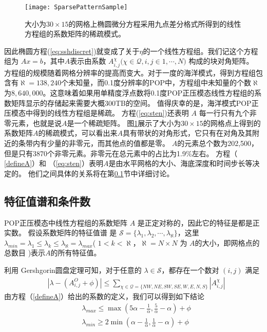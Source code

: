 \begin{figure}
\centering
\texttt{[image: SparsePatternSample]}
\caption[] {大小为$30\times 15$的网格上椭圆微分方程采用九点差分格式所得到的线性方程组的系数矩阵的稀疏模式。 \label{fig:spy}}
\end{figure}
因此椭圆方程(\ref{eq:sshdiscret})就变成了关于$\eta$的一个线性方程组。我们记这个方程组为 $Ax= b$，其中$A$表示由系数 $A_{i,j}^{\chi } ( \chi \in \mathcal{Q}, i,j \in {1,\cdots, N)}$ 构成的块对角矩阵。
方程组的规模随着网格分辨率的提高而变大。对于一度的海洋模式，得到方程组包含有$\aleph = 138,240$个未知量，而0.1度分辨率的POP中，方程组中未知量的个数$\aleph$ 为$8,640,000$。这意味着如果用单精度浮点数将0.1度POP正压模态线性方程组的系数矩阵显示的存储起来需要大概300TB的空间。
值得庆幸的是，海洋模式POP正压模态中得到的线性方程组是稀疏。
方程(\ref{eq:sten})还表明 $A$ 每一行只有九个非零元素，也就是说$A$是一个稀疏矩阵。 图\ref{fig:spy}展示了大小为$30\times 15$的网格点上得到的系数矩阵$A$的稀疏模式，可以看出来$A$具有带状的对角形式，它只有在对角及其附近的条带内有少量的非零元，而其他点的值都是零。
$A$的元素总个数为202,500，但是只有3870个非零元素。非零元在总元素中的占比为1.9\%左右。
方程（ \ref{defineA}）和 （\ref{eq:sten}）表明$A$是由水平网格的大小、海底深度和时间步长等决定的。
他们之间具体的关系将在第\ref{solver:Algorithm:condition}节中详细讨论。

\subsection{特征值谱和条件数}
\label{solver:Algorithm:condition}

POP正压模态中线性方程组的系数矩阵 $A$ 是正定对称的\cite{smith2010parallel}，因此它的特征是都是正实数\cite{stewart1976positive}。
假设系数矩阵的特征值谱\cite{golub2012matrix} 是 $\mathcal{S} = \{\lambda_1, \lambda_2, \cdots, \lambda_\aleph\}$，这里 $\lambda_{min} = \lambda_1 \le \lambda_k \le \lambda_\aleph = \lambda_{max}$( $1<k <\aleph $，$\aleph=N\times N$ 为 $A$的大小，即网格点的总数目 )表示$A$的所有特征值。

利用 Gershgorin圆盘定理\cite{bell1965gershgorin}可知，对于任意的 $\lambda \in \mathcal{S}$，都存在一个数对 $(i,j)$ 满足
\begin{align}
&|\lambda -  (A_{i,j}^O + \phi ) | \le \sum_{\chi \in \mathcal{Q} = \{NW,NE,SW,SE,W,E,N,S\}}|A_{i,j}^\chi|
\end{align}
由方程（\ref{defineA}）给出的系数的定义，我们可以得到如下结论 
\begin{align} \label{eigsGersh}
&\lambda_{max} \le  \max (  5\alpha - \frac{1}{\alpha}, \frac{5}{\alpha}- \alpha) +\phi   \\
&\lambda_{min} \ge 2\min (  \alpha - \frac{1}{\alpha},\frac{1} {\alpha} -  \alpha) + \phi
\end{align}

